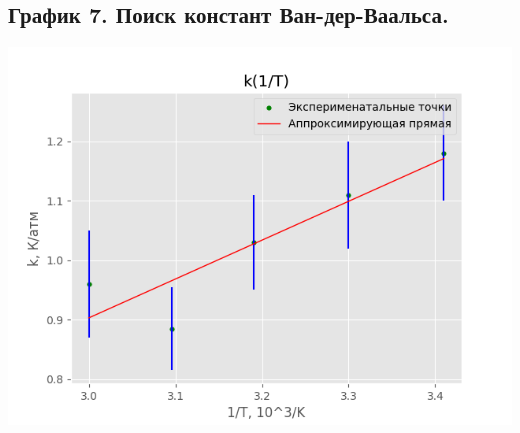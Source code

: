 \documentclass[15pt,a5paper,reqno]{article}
\begin{document}
    \subsection{График 7. Поиск констант Ван-дер-Ваальса.}
    \begin{center}
        \includegraphics[width=\textwidth]{Van_der_Waals_2.png}
    \end{center}
\end{document}
